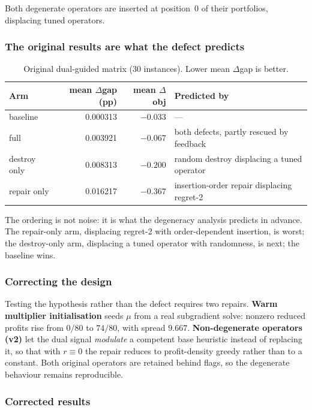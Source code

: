 \documentclass[11pt,a4paper]{article}
\begin{document}
Both degenerate operators are inserted at position~0 of their portfolios,
displacing tuned operators.

\subsubsection{The original results are what the defect predicts}

\begin{table}[htbp]
\centering
\caption{Original dual-guided matrix (30 instances). Lower mean $\Delta$gap is
better.}
\label{tab:h2-orig}
\begin{tabular}{lrrl}
\toprule
Arm & mean $\Delta$gap (pp) & mean $\Delta$obj & Predicted by \\
\midrule
baseline     & 0.000313 & $-0.033$ & --- \\
full         & 0.003921 & $-0.067$ & both defects, partly rescued by feedback \\
destroy only & 0.008313 & $-0.200$ & random destroy displacing a tuned operator \\
repair only  & 0.016217 & $-0.367$ & insertion-order repair displacing regret-2 \\
\bottomrule
\end{tabular}
\end{table}

The ordering is not noise: it is what the degeneracy analysis predicts in advance.
The repair-only arm, displacing regret-2 with order-dependent insertion, is worst;
the destroy-only arm, displacing a tuned operator with randomness, is next; the
baseline wins.

\subsubsection{Correcting the design}\label{sec:h2-fix}

Testing the hypothesis rather than the defect requires two repairs. \textbf{Warm
multiplier initialisation} seeds $\mu$ from a real subgradient solve: nonzero
reduced profits rise from $0/80$ to $74/80$, with spread $9.667$.
\textbf{Non-degenerate operators (v2)} let the dual signal \emph{modulate} a
competent base heuristic instead of replacing it, so that with $r\equiv 0$ the
repair reduces to profit-density greedy rather than to a constant. Both original
operators are retained behind flags, so the degenerate behaviour remains
reproducible.

\subsubsection{Corrected results}\label{sec:h2-results}
\end{document}
